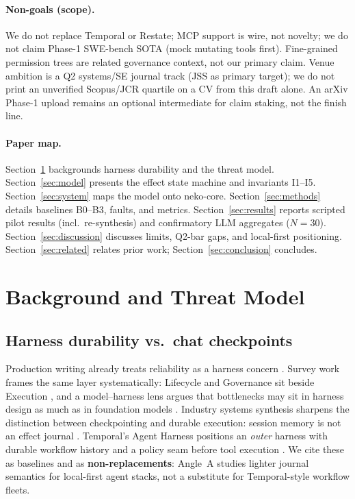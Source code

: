 \documentclass[11pt,a4paper]{article}
\begin{document}
\paragraph{Non-goals (scope).}
We do not replace Temporal or Restate; MCP support is wire, not novelty;
we do not claim Phase-1 SWE-bench SOTA (mock mutating tools first).
Fine-grained permission trees \cite{ac4a2026} are related governance
context, not our primary claim. Venue ambition is a Q2 systems/SE journal
track (JSS as primary target); we do not print an unverified Scopus/JCR
quartile on a CV from this draft alone. An arXiv Phase-1 upload remains an
optional intermediate for claim staking, not the finish line.

\paragraph{Paper map.}
Section~\ref{sec:background} backgrounds harness durability and the threat
model. Section~\ref{sec:model} presents the effect state machine and
invariants I1--I5. Section~\ref{sec:system} maps the model onto neko-core.
Section~\ref{sec:methods} details baselines B0--B3, faults, and metrics.
Section~\ref{sec:results} reports scripted pilot results (incl.\
re-synthesis) and confirmatory LLM aggregates ($N{=}30$).
Section~\ref{sec:discussion} discusses limits, Q2-bar gaps, and local-first
positioning. Section~\ref{sec:related} relates prior work;
Section~\ref{sec:conclusion} concludes.

\section{Background and Threat Model}
\label{sec:background}

\subsection{Harness durability vs.\ chat checkpoints}

Production writing already treats reliability as a harness concern
\cite{anthropic2025harnesses}. Survey work frames the same layer
systematically: Lifecycle and Governance sit beside Execution
\cite{li2026harnesssurvey}, and a model--harness lens argues that
bottlenecks may sit in harness design as much as in foundation models
\cite{guo2026fromqa}. Industry systems synthesis sharpens the distinction
between checkpointing and durable execution: session memory is not an
effect journal \cite{zylos2026durable}. Temporal's Agent Harness positions
an \emph{outer} harness with durable workflow history and a policy seam
before tool execution \cite{temporal2026agentharness}. We cite these as
baselines and as \textbf{non-replacements}: Angle~A studies lighter journal
semantics for local-first agent stacks, not a substitute for Temporal-style
workflow fleets.
\end{document}

